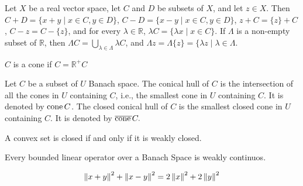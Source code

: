Let $X$ be a real  vector space, let $C$ and $D$ be subsets of $X$, and let $z \in X$. Then
 $C + D =\lbrace x + y \mid x \in C, y \in D\rbrace$, $C -D =\lbrace x - y \mid x \in C, y \in D\rbrace$,
$z+C=\lbrace z \rbrace +C$, $C-z=C-\lbrace z \rbrace$, and for every $\lambda \in \mathbb{R}$, $\lambda C =\lbrace\lambda x \mid x \in C\rbrace$. If $\Lambda$ is a non-empty subset of $\mathbb{R}$, then $\Lambda C = \bigcup_{\lambda \in \Lambda}\lambda C$, and $\Lambda z = \Lambda \lbrace z \rbrace =\lbrace\lambda z \mid \lambda \in \Lambda$.



\begin{definition}
	$C$ is a cone if $C=\mathbb{R}^+C$
\end{definition}
\begin{definition}
Let $C$ be a subset of $U$ Banach space. The conical hull of $C$ is the intersection of all the cones in $U$ containing $C$, i.e., the smallest cone in $U$ containing $C$. It is denoted by $\mathrm{cone\,} C$. The closed conical hull of $C$ is the smallest closed cone in $U$ containing $C$. It is denoted by $\overline{\mathrm{cone\,}} C.$
\end{definition}

\begin{lemma}
	A convex set is closed if and only if it is weakly closed.
\end{lemma}

\begin{lemma}
	Every bounded linear operator over a Banach Space is weakly continuos.
\end{lemma}

\begin{lemma}
	
\[
\left\lVert x+y\right\rVert^2 +\left\lVert x-y\right\rVert^2 = 2\left\lVert x\right\rVert^2+2\left\lVert y\right\rVert^2
\]
\end{lemma}

